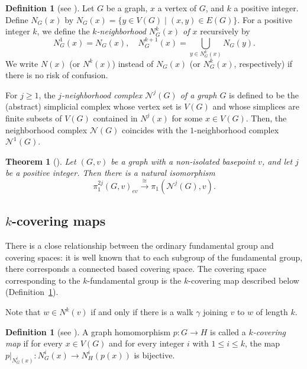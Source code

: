 \documentclass[11pt, amsfonts]{amsart}
\numberwithin{equation}{section}
\newtheorem{theorem}[thm]{Theorem}
\theoremstyle{definition}
\newtheorem{definition}[thm]{Definition}
\theoremstyle{remark}
\newcommand{\N}{\mathcal{N}}
\begin{document}
\begin{definition}[{see \cite[Section~4]{MatsushitaJMSUT}}] \label{definition k-neighborhood}
Let $G$ be a graph, $x$ a vertex of $G$, and $k$ a positive integer. Define $N_G(x)$ by $N_G(x) = \{ y \in V(G) \mid (x,y) \in E(G) \}$. For a positive integer $k$, we define the \emph{$k$-neighborhood $N_G^k(x)$ of $x$} recursively by
\[ N^1_G(x) = N_G(x), \quad N^{k+1}_G(x) = \bigcup_{y \in N^k_G(x)} N_G(y).\]
We write $N(x)$ (or $N^k(x)$) instead of $N_G(x)$ (or $N^k_G(x)$, respectively) if there is no risk of confusion.
\end{definition}

For $j \ge 1$, the \emph{$j$-neighborhood complex $\N^j(G)$ of a graph $G$} is defined to be the (abstract) simplicial complex whose vertex set is $V(G)$ and whose simplices are finite subsets of $V(G)$ contained in $N^j(x)$ for some $x \in V(G)$. Then, the neighborhood complex $\N(G)$ coincides with the $1$-neighborhood complex $\N^1(G)$.

\begin{theorem}[{\cite[Theorem~1.1]{MatsushitaJMSUT}}] \label{theorem neighborhood complex}
Let $(G,v)$ be a graph with a non-isolated basepoint $v$, and let $j$ be a positive integer. Then there is a natural isomorphism
\[
\pi^{2j}_1(G,v)_{ev} \xrightarrow{\cong} \pi_1(\N^j(G),v).
\]
\end{theorem}



\subsection{$k$-covering maps} \label{subsection k-covering}

There is a close relationship between the ordinary fundamental group and covering spaces: it is well known that to each subgroup of the fundamental group, there corresponds a connected based covering space. The covering space corresponding to the $k$-fundamental group is the $k$-covering map described below (Definition~\ref{definition k-covering}).

Note that $w \in N^k(v)$ if and only if there is a walk $\gamma$ joining $v$ to $w$ of length $k$.

\begin{definition}[{see \cite[Definition~6.1]{MatsushitaJMSUT}}] \label{definition k-covering}
A graph homomorphism $p \colon G \to H$ is called a \emph{$k$-covering map} if for every $x \in V(G)$ and for every integer $i$ with $1 \le i \le k$, the map $p|_{N^i_G(x)} \colon N^i_G(x) \to N^i_H(p(x))$ is bijective.
\end{definition}
\end{document}
